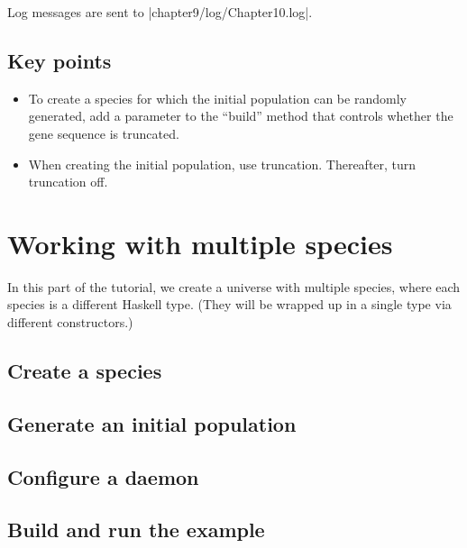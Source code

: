 \documentclass[a4paper,10pt]{report}
\begin{document}
Log messages are sent to |chapter9/log/Chapter10.log|.

\section{Key points}

\begin{itemize}
\item To create a species for which the initial population can be randomly generated,
add a parameter to the ``build'' method that controls whether the gene sequence is truncated.
\item When creating the initial population, use truncation.
Thereafter, turn truncation off.
\end{itemize}

\chapter{Working with multiple species}
\label{sec:multiple}

In this part of the tutorial, we create a universe with multiple species,
where each species is a different Haskell type.
(They will be wrapped up in a single type via different constructors.)

\section{Create a species}
\label{sec:species5}






\section{Generate an initial population}
\label{sec:pop5}



\section{Configure a daemon}
\label{sec:daemon5}



\section{Build and run the example}
\label{sec:run5}
\end{document}
